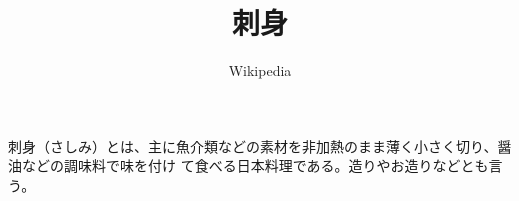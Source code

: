 \documentclass{article}
\title{刺身}
\author{Wikipedia}
\date{}
\begin{document}
\maketitle

刺身（さしみ）とは、主に魚介類などの素材を非加熱のまま薄く小さく切り、醤油などの調味料で味を付け
て食べる日本料理である。造りやお造りなどとも言う。
\end{document}
